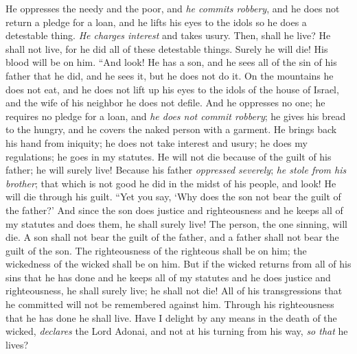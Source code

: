 \begin{biblechapter}
\verse He oppresses the needy and the poor, and \textit{he commits robbery}, and he does not return a pledge for a loan, and he lifts his eyes to the idols so he does a detestable thing.
\verse \textit{He charges interest} and takes usury. Then, shall he live? He shall not live, for he did all of these detestable things. Surely he will die! His blood will be on him.
\verse “And look! He has a son, and he sees all of the sin of his father that he did, and he sees it, but he does not do it.
\verse On the mountains he does not eat, and he does not lift up his eyes to the idols of the house of Israel, and the wife of his neighbor he does not defile.
\verse And he oppresses no one; he requires no pledge for a loan, and \textit{he does not commit robbery}; he gives his bread to the hungry, and he covers the naked person with a garment.
\verse He brings back his hand from iniquity; he does not take interest and usury; he does my regulations; he goes in my statutes. He will not die because of the guilt of his father; he will surely live!
\verse Because his father \textit{oppressed severely}; \textit{he stole from his brother}; that which is not good he did in the midst of his people, and look! He will die through his guilt.
\verse “Yet you say, ‘Why does the son not bear the guilt of the father?’ And since the son does justice and righteousness and he keeps all of my statutes and does them, he shall surely live!
\verse The person, the one sinning, will die. A son shall not bear the guilt of the father, and a father shall not bear the guilt of the son. The righteousness of the righteous shall be on him; the wickedness of the wicked shall be on him.
\verse But if the wicked returns from all of his sins that he has done and he keeps all of my statutes and he does justice and righteousness, he shall surely live; he shall not die!
\verse All of his transgressions that he committed will not be remembered against him. Through his righteousness that he has done he shall live.
\verse Have I delight by any means in the death of the wicked, \textit{declares} the Lord Adonai, and not at his turning from his way, \textit{so that} he lives?

\end{biblechapter}
